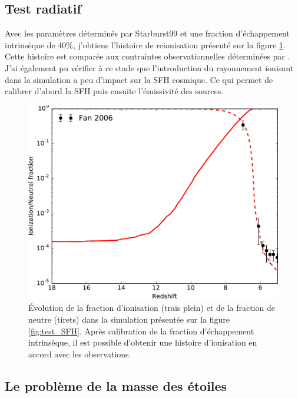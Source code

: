 \clearpage

\subsection{Test radiatif}
Avec les paramètres déterminés par Starburst99 et une fraction d'échappement intrinsèque de 40\%, j'obtiens l'histoire de reionisation présenté sur la figure \ref{fig:test_xion}.
Cette histoire est comparée aux contraintes observationnelles déterminées par \cite{fan_constraining_2006}.
J'ai également pu vérifier à ce stade que l'introduction du rayonnement ionisant dans la simulation a peu d'impact sur la \ac{SFH} cosmique.
Ce qui permet de calibrer d'abord la \ac{SFH} puis ensuite l'émissivité des sources.

\begin{figure}
        \includegraphics[width=.95\linewidth]{img/02/xion.pdf} 
        \caption[Histoire d'ionisation]{Évolution de la fraction d'ionisation (trais plein) et de la fraction de neutre (tirets) dans la simulation présentée sur la figure \ref{fig:test_SFH}.
        Après calibration de la fraction d’échappement intrinsèque, il est possible d'obtenir une histoire d'ionisation en accord avec les observations.
 		\label{fig:test_xion}}
\end{figure}

\subsection{Le problème de la masse des étoiles}


